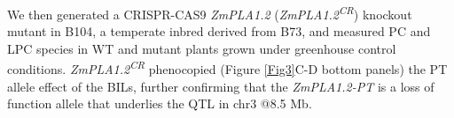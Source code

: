 \documentclass[9pt,twocolumn,twoside,lineno]{BioRxiv}
\begin{document}
We then generated a CRISPR-CAS9 \textit{ZmPLA1.2} (\textit{ZmPLA1.2\textsuperscript{CR}}) knockout mutant in B104, a temperate inbred derived from B73, and measured PC and LPC species in WT and mutant plants grown under greenhouse control conditions. 
\textit{ZmPLA1.2\textsuperscript{CR}} phenocopied (Figure \ref{Fig3}C-D bottom panels) the PT allele effect of the BILs, further confirming that the \textit{ZmPLA1.2-PT} is a loss of function allele that underlies the QTL in chr3 @8.5 Mb. 
\end{document}
